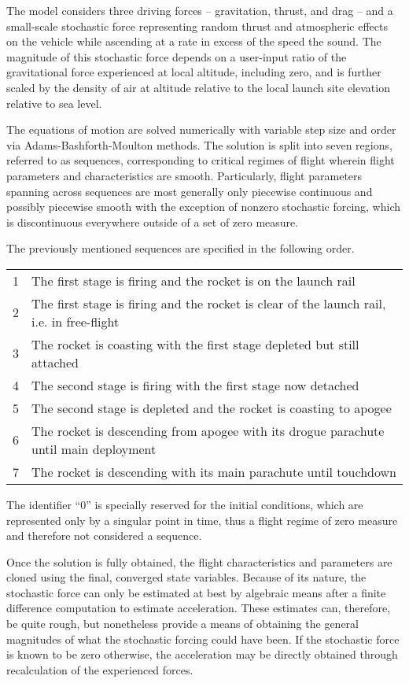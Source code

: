 \documentclass[11pt]{thesis}
\numberwithin{equation}{section}
\begin{document}
The model considers three driving forces -- gravitation, thrust, and drag -- and a small-scale stochastic force representing random thrust and atmospheric effects on the vehicle while ascending at a rate in excess of the speed the sound. The magnitude of this stochastic force depends on a user-input ratio of the gravitational force experienced at local altitude, including zero, and is further scaled by the density of air at altitude relative to the local launch site elevation relative to sea level.

The equations of motion are solved numerically with variable step size and order via Adams-Bashforth-Moulton methods. The solution is split into seven regions, referred to as sequences, corresponding to critical regimes of flight wherein flight parameters and characteristics are smooth. Particularly, flight parameters spanning across sequences are most generally only piecewise continuous and possibly piecewise smooth with the exception of nonzero stochastic forcing, which is discontinuous everywhere outside of a set of zero measure.

The previously mentioned sequences are specified in the following order.
\begin{longtable}[l]{l l}
1 & The first stage is firing and the rocket is on the launch rail \\
2 & The first stage is firing and the rocket is clear of the launch rail, i.e. in free-flight \\
3 & The rocket is coasting with the first stage depleted but still attached \\
4 & The second stage is firing with the first stage now detached \\
5 & The second stage is depleted and the rocket is coasting to apogee \\
6 & The rocket is descending from apogee with its drogue parachute until main deployment \\
7 & The rocket is descending with its main parachute until touchdown \\
\end{longtable}
The identifier ``0'' is specially reserved for the initial conditions, which are represented only by a singular point in time, thus a flight regime of zero measure and therefore not considered a sequence.

Once the solution is fully obtained, the flight characteristics and parameters are cloned using the final, converged state variables. Because of its nature, the stochastic force can only be estimated at best by algebraic means after a finite difference computation to estimate acceleration. These estimates can, therefore, be quite rough, but nonetheless provide a means of obtaining the general magnitudes of what the stochastic forcing could have been. If the stochastic force is known to be zero otherwise, the acceleration may be directly obtained through recalculation of the experienced forces.
\end{document}
